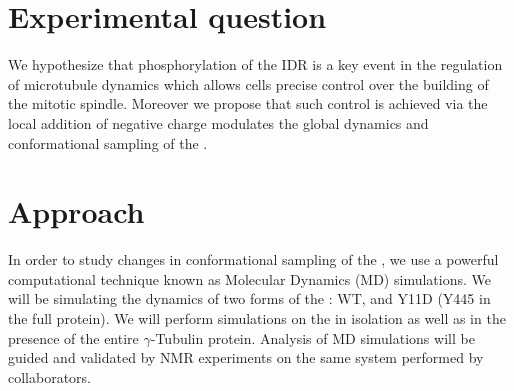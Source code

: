 \clearpage 
 
 \section{Experimental question}
 
We hypothesize that phosphorylation of the \gct IDR is a key event in the regulation of microtubule dynamics which allows cells precise control over the building of the mitotic spindle. Moreover we propose that such control is achieved via the local  addition of negative charge modulates the global dynamics and conformational sampling of the \gct.
 
 
 \section{Approach}
 

In order to study changes in conformational sampling of the \gct, we use a powerful computational technique known as Molecular Dynamics (MD) simulations. We will be simulating the dynamics of two forms of the \gct: WT, and Y11D (Y445 in the full protein). We will perform simulations on the \gct in isolation as well as in the presence of the entire $\gamma$-Tubulin protein. Analysis of MD simulations will be guided and validated by NMR experiments on the same system performed by collaborators.

 
 
 
 
 